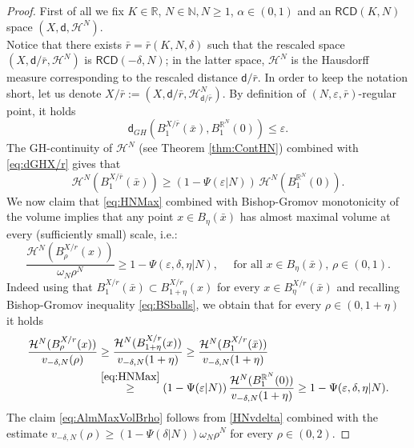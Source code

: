 \documentclass[a4paper]{amsart}
\theoremstyle{plain}
\theoremstyle{definition}
\numberwithin{equation}{section}
\newcommand{\R}{\mathbb{R}}
\newcommand{\N}{\mathbb{N}}
\newcommand{\RCD}{\mathsf{RCD}}
\newcommand{\sfd}{\mathsf d}
\newcommand{\cH}{\mathcal{H}}
\begin{document}
{\begin{proof}

First of all we fix $K\in \R$, $N\in \N, N\geq 1$, $\alpha\in (0,1)$ and an  $\RCD(K,N)$ space  $(X,\sfd, \cH^{N})$.  
\\Notice that there exists $\bar{r} =\bar{r}(K,N,\delta)$ such that  the rescaled space $(X,\sfd/\bar{r}, \cH^{N})$ is  $\RCD(-\delta, N)$; in the latter space, $\cH^{N}$ is the Hausdorff measure corresponding to the rescaled distance $\sfd/{\bar{r}}$. In order to keep the notation short, let us denote $X/{\bar{r}}:=(X,\sfd/{\bar{r}},  \cH^{N}_{\sfd/{\bar{r}}})$. 
By definition of $(N,\varepsilon, {\bar{r}})$-regular point, it holds 
\begin{equation}\label{eq:dGHX/r}
\sfd_{GH}(B_{1}^{X/{\bar{r}}}(\bar{x}), B_{1}^{\R^{N}}(0))\leq \varepsilon.
\end{equation}
The GH-continuity of $\cH^{N}$ (see Theorem \ref{thm:ContHN}) combined with \eqref{eq:dGHX/r} gives that 
\begin{equation}\label{eq:HNMax}
\cH^{N}(B_{1}^{X/\bar{r}}(\bar{x})) \geq (1-\Psi(\varepsilon|N))\, \cH^{N}(B_{1}^{\R^{N}}(0)).
\end{equation}
We now claim that \eqref{eq:HNMax} combined with Bishop-Gromov monotonicity of the volume  implies that any point $x\in B_{\eta}(\bar{x})$ has almost maximal volume at every (sufficiently small) scale, i.e.:
\begin{equation}\label{eq:AlmMaxVolBrho}
\frac{\cH^{N}(B^{X/r}_{\rho}(x))}{\omega_{N} \rho^{N}}\geq 1-\Psi(\varepsilon,\delta, \eta|N), \quad \text{ for all } x\in B_{\eta}(\bar{x}), \,  \rho\in (0, 1). 
\end{equation}
Indeed using that $B^{X/r}_{1}(\bar{x})\subset B^{X/r}_{1+\eta}(x)$ for every $x\in B^{X/r}_{\eta}(\bar x)$ and recalling Bishop-Gromov inequality \eqref{eq:BSballs},  we obtain that for every $\rho\in (0, 1+\eta)$ it holds
\begin{align}
\frac{\cH^{N}(B^{X/r}_{\rho}(x))}{v_{-\delta,N}(\rho)}& \geq  \frac{\cH^{N}(B^{X/r}_{1+\eta}(x))}{v_{-\delta,N}(1+\eta)} \geq  \frac{\cH^{N}(B^{X/r}_{1}(\bar x))}{v_{-\delta,N}(1+\eta)} \nonumber \\
& \overset{\eqref{eq:HNMax}}{\geq}   (1-\Psi(\varepsilon|N))\, \frac{\cH^{N}(B_{1}^{\R^{N}}(0))}{v_{-\delta,N}(1+\eta)} \geq 1-\Psi(\varepsilon,\delta, \eta|N). \label{HNvdelta}
\end{align}
The claim \eqref{eq:AlmMaxVolBrho} follows from  \eqref{HNvdelta} combined with the estimate $v_{-\delta,N}(\rho)\geq (1-\Psi(\delta|N)) \omega_{N}  \rho^{N} $ for every $\rho\in (0, 2)$.

\end{proof}}
\end{document}
